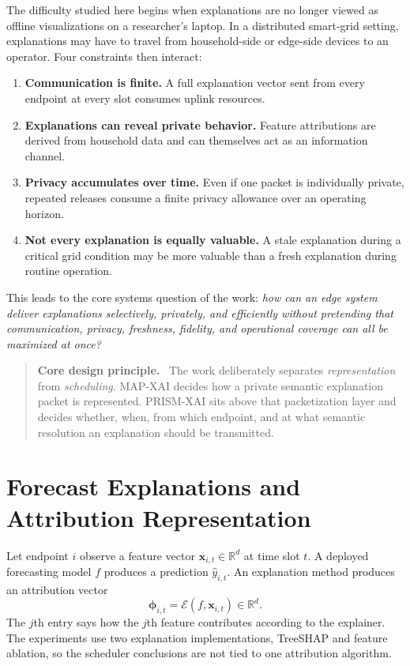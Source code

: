 \documentclass[11pt]{article}
\newenvironment{interpretationbox}[1]{%
  \begin{quote}\small\noindent\textbf{#1}\ }{\end{quote}}
\begin{document}
The difficulty studied here begins when explanations are no longer viewed as offline visualizations on a researcher's laptop. In a distributed smart-grid setting, explanations may have to travel from household-side or edge-side devices to an operator. Four constraints then interact:
\begin{enumerate}[leftmargin=2em]
\item \textbf{Communication is finite.} A full explanation vector sent from every endpoint at every slot consumes uplink resources.
\item \textbf{Explanations can reveal private behavior.} Feature attributions are derived from household data and can themselves act as an information channel.
\item \textbf{Privacy accumulates over time.} Even if one packet is individually private, repeated releases consume a finite privacy allowance over an operating horizon.
\item \textbf{Not every explanation is equally valuable.} A stale explanation during a critical grid condition may be more valuable than a fresh explanation during routine operation.
\end{enumerate}

This leads to the core systems question of the work: \emph{how can an edge system deliver explanations selectively, privately, and efficiently without pretending that communication, privacy, freshness, fidelity, and operational coverage can all be maximized at once?}

\begin{interpretationbox}{Core design principle.}
The work deliberately separates \emph{representation} from \emph{scheduling}. MAP-XAI decides how a private semantic explanation packet is represented. PRISM-XAI sits above that packetization layer and decides whether, when, from which endpoint, and at what semantic resolution an explanation should be transmitted.
\end{interpretationbox}

\section{Forecast Explanations and Attribution Representation}
Let endpoint $i$ observe a feature vector $\mathbf{x}_{i,t}\in\mathbb{R}^d$ at time slot $t$. A deployed forecasting model $f$ produces a prediction $\hat y_{i,t}$. An explanation method produces an attribution vector
\[
\boldsymbol{\phi}_{i,t}=\mathcal{E}(f,\mathbf{x}_{i,t})\in\mathbb{R}^d.
\]
The $j$th entry says how the $j$th feature contributes according to the explainer. The experiments use two explanation implementations, TreeSHAP and feature ablation, so the scheduler conclusions are not tied to one attribution algorithm.
\end{document}
